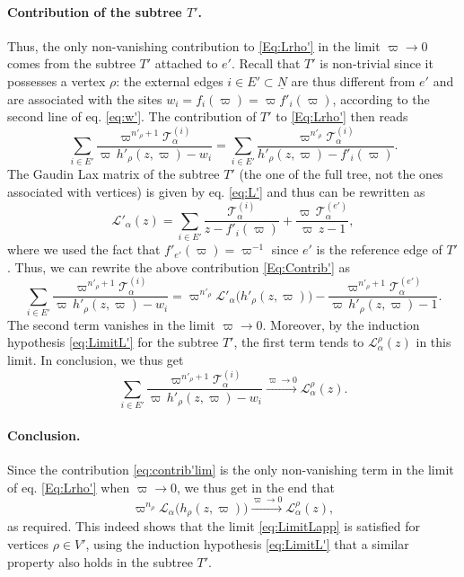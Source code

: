 \documentclass{article}
\def\Lc{\mathcal{L}}
\begin{document}
\paragraph{Contribution of the subtree $T'$.} Thus, the only non-vanishing contribution to \eqref{Eq:Lrho'} in the limit $\varpi\to0$ comes from the subtree $T'$ attached to $e'$. Recall that $T'$ is non-trivial since it possesses a vertex $\rho$: the external edges $i\in E'\subset\underline{N}$ are thus different from $e'$ and are associated with the sites $w_{i} = f_i(\varpi) = \varpi f'_{i}(\varpi)$, according to the second line of eq. \eqref{eq:w'}. The contribution of $T'$ to \eqref{Eq:Lrho'} then reads
\begin{equation}\label{Eq:Contrib'}
\sum_{i \in E'} \frac{\varpi^{n'_\rho+1}\mathcal{T}_\alpha^{(i)}}{\varpi\,h'_\rho(z,\varpi) - w_{i}} = \sum_{i \in E'} \frac{\varpi^{n'_\rho}\mathcal{T}_\alpha^{(i)}}{h'_\rho(z,\varpi) - f'_{i}(\varpi)}.
\end{equation}
The Gaudin Lax matrix of the subtree $T'$ (the one of the full tree, not the ones associated with vertices) is given by eq. \eqref{eq:L'} and thus can be rewritten as
\begin{equation}
\Lc'_\alpha(z) = \sum_{i\in E'} \frac{\mathcal{T}_\alpha^{(i)}}{z-f'_{i}(\varpi)} + \frac{\varpi\,\mathcal{T}_\alpha^{(e')}}{\varpi\,z-1},
\end{equation}
where we used the fact that $f'_{e'}(\varpi)=\varpi^{-1}$ since $e'$ is the reference edge of $T'$. Thus, we can rewrite the above contribution \eqref{Eq:Contrib'} as
\begin{equation}
\sum_{i \in E'} \frac{\varpi^{n'_\rho+1}\mathcal{T}_\alpha^{(i)}}{\varpi\,h'_\rho(z,\varpi) - w_{i}} = \varpi^{n'_\rho} \Lc'_\alpha \bigl( h'_{\rho}(z,\varpi) \bigr) - \frac{\varpi^{n'_\rho+1}\mathcal{T}_\alpha^{(e')}}{\varpi \,h'_\rho(z,\varpi) - 1}.
\end{equation}
The second term vanishes in the limit $\varpi \to 0$. Moreover, by the induction hypothesis \eqref{eq:LimitL'} for the subtree $T'$, the first term tends to $\Lc_\alpha^\rho(z)$ in this limit. In conclusion, we thus get
\begin{equation}\label{eq:contrib'lim}
\sum_{i \in E'} \frac{\varpi^{n'_\rho+1}\mathcal{T}_\alpha^{(i)}}{\varpi\,h'_\rho(z,\varpi) - w_{i}} \xrightarrow{\varpi\to 0}  \Lc_\alpha^\rho(z).
\end{equation}

\paragraph{Conclusion.} Since the contribution \eqref{eq:contrib'lim} is the only non-vanishing term in the limit of eq. \eqref{Eq:Lrho'} when $\varpi\to 0$, we thus get in the end that
\begin{equation}
\varpi^{n_\rho} \Lc_\alpha \bigl( h_\rho(z,\varpi) \bigr) \xrightarrow{\varpi\to 0}  \Lc_\alpha^\rho(z),
\end{equation}
as required. This indeed shows that the limit \eqref{eq:LimitLapp} is satisfied for vertices $\rho\in V'$, using the induction hypothesis \eqref{eq:LimitL'} that a similar property also holds in the subtree $T'$.
\end{document}
